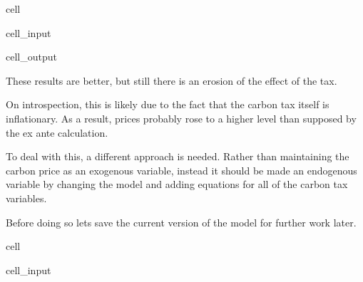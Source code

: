 \documentclass[letterpaper,10pt,english]{jupyterBook}
\begin{document}
\begin{sphinxuseclass}{cell}\begin{sphinxVerbatimInput}

\begin{sphinxuseclass}{cell_input}
\begin{sphinxVerbatim}[commandchars=\\\{\}]
\PYG{p}{[}\PYG{p}{]}
\end{sphinxVerbatim}

\end{sphinxuseclass}\end{sphinxVerbatimInput}
\begin{sphinxVerbatimOutput}

\begin{sphinxuseclass}{cell_output}
\noindent{}

\end{sphinxuseclass}\end{sphinxVerbatimOutput}

\end{sphinxuseclass}
\sphinxAtStartPar
These results are better, but still there is an erosion of the effect of the tax.

\sphinxAtStartPar
On introspection, this is likely due to the fact that the carbon tax itself is inflationary.  As a result, prices probably rose to a higher level than supposed by the ex ante calculation.

\sphinxAtStartPar
To deal with this, a different approach is needed.  Rather than maintaining the carbon price as an exogenous variable, instead it should be made an endogenous variable by changing the model and adding equations for all of the carbon tax variables.

\sphinxAtStartPar
Before doing so lets save the current version of the model for further work later.

\begin{sphinxuseclass}{cell}\begin{sphinxVerbatimInput}

\begin{sphinxuseclass}{cell_input}
\begin{sphinxVerbatim}[commandchars=\\\{\}]
\end{sphinxVerbatim}

\end{sphinxuseclass}\end{sphinxVerbatimInput}

\end{sphinxuseclass}
\end{document}
